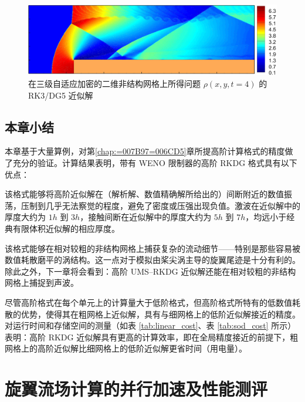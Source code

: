 \begin{figure}[h!]
\begin{centering}
\includegraphics[width=1\textwidth]{figures/forward_step/qiu}
\par\end{centering}
\caption{\label{fig:forward_step_p=00003D5_qiu}在三级自适应加密的二维非结构网格上所得问题
$\rho(x,y,t=4)$ 的 RK3/DG5 近似解}
\end{figure}


\section{本章小结}

本章基于大量算例，对第\ref{chap:=007B97=006CD5}章所提高阶计算格式的精度做了充分的验证。计算结果表明，带有
WENO 限制器的高阶 RKDG 格式具有以下优点：
\begin{description}[wide]
\item [{基本无振荡}] 该格式能够将高阶近似解在（解析解、数值精确解所给出的）间断附近的数值振荡，压制到几乎无法察觉的程度，避免了密度或压强出现负值。激波在近似解中的厚度大约为
$1h$ 到 $3h$，接触间断在近似解中的厚度大约为 $5h$ 到 $7h$，均远小于经典有限体积近似解的相应厚度。
\item [{数值耗散低}] 该格式能够在相对较粗的非结构网格上捕获复杂的流动细节——特别是那些容易被数值耗散磨平的涡结构。这一点对于模拟由桨尖涡主导的旋翼尾迹是十分有利的。除此之外，下一章将会看到：高阶
UMS–RKDG 近似解还能在相对较粗的非结构网格上捕捉到声波。
\item [{计算效率高}] 尽管高阶格式在每个单元上的计算量大于低阶格式，但高阶格式所特有的低数值耗散的优势，使得其在粗网格上近似解，具有与细网格上的低阶近似解接近的精度。对运行时间和存储空间的测量（如表
\ref{tab:linear_cost}、表 \ref{tab:sod_cost} 所示）表明：高阶 RKDG 近似解具有更高的计算效率，即在全局精度接近的前提下，粗网格上的高阶近似解比细网格上的低阶近似解更省时间（用电量）。
\end{description}
%

\chapter{旋翼流场计算的并行加速及性能测评\label{chap:=005E76=00884C}}

